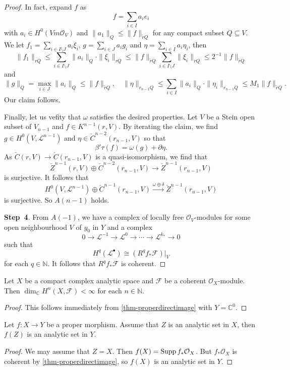 \begin{proof}
In fact, expand $f$ as 
\[
    f=\sum_{i\in I}a_i e_i  
\]
with $a_i\in H^0(Vm\mathcal{O}_V)$ and $\|a_1\|_Q\leq \|f\|_{\tilde{r}Q}$ for any compact subset $Q\subseteq V$. We let $f_1=\sum_{i\in I\setminus J}a_i \xi_i$, $g=\sum_{i\in J}a_i g_i$ and $\eta=\sum_{i\in I}a_i\eta_i$, then
\[
    \|f_1\|_{rQ}\leq \sum_{i\in I\setminus J}\|a_i\|_Q\cdot\|\xi_i\|_{rQ}\leq \|f\|_{\tilde{r}Q}\sum_{i\in I\setminus J}\|\xi_i\|_{rQ}\leq 2^{-1}\|f\|_{\tilde{r}Q}
\]
and
\[
\|g\|_Q=\max_{i\in J}\|a_i\|_Q\leq \|f\|_{\tilde{r}Q},\quad \|\eta\|_{r_{n-1}Q}\leq \sum_{i\in I}\|a_i\|_Q\cdot\|\eta_i\|_{r_{n-1}Q}\leq M_1\|f\|_{\tilde{r}Q}.    
\]
Our claim follows.

Finally, let us vefity that $\omega$ satisfies the desired properties. Let $V$ be a Stein open subset of $V_{n-1}$ and $f\in K^{n-1}(r,V)$. By iterating the claim, we find $g\in H^0(V,\mathcal{L}^{n-1})$ and $\eta\in \check{C}^{n-2}(r_{n-1},V)$ so that
\[
    \beta'\tau(f)=\omega(g)+\partial \eta.  
\]
As $\check{C}(r,V)\rightarrow \check{C}(r_{n-1},V)$ is a quasi-isomorphism, we find that 
\[
\check{Z}^{n-1}(r,V)\oplus \check{C}^{n-2}(r_{n-1},V)\rightarrow     \check{Z}^{n-1}(r_{n-1},V)
\]
is surjective. It follows that 
\[
H^0(V,\mathcal{L}^{n-1})\oplus \check{C}^{n-1}(r_{n-1},V)\xrightarrow{\omega\oplus \delta} \check{Z}^{n-1}(r_{n-1},V)
\]
is surjective. So $A(n-1)$ holds.

\textbf{Step~4}. From $A(-1)$, we have a complex of locally free $\mathcal{O}_V$-modules for some open neighbourhood $V$ of $y_0$ in $Y$ and a complex
\[
0\rightarrow \mathcal{L}^{-1}\rightarrow \mathcal{L}^0\rightarrow \cdots\rightarrow \mathcal{L}^{k_*}\rightarrow 0    
\]
such that
\[
    H^q(\mathcal{L}^{\bullet})\cong (R^qf_*\mathcal{F})|_V    
\]
for each $q\in \mathbb{N}$. It follows that $R^qf_*\mathcal{F}$ is coherent.
\end{proof}

\begin{corollary}
    Let $X$ be a compact complex analytic space and $\mathcal{F}$ be a coherent $\mathcal{O}_X$-module. Then $\dim_{\mathbb{C}}H^n(X,\mathcal{F})<\infty$ for each $n\in \mathbb{N}$.
\end{corollary}
\begin{proof}
    This follows immediately from \cref{thm-properdirectimage} with $Y=\mathbb{C}^0$.
\end{proof}

\begin{corollary}
    Let $f:X\rightarrow Y$ be a proper morphism. Assume that $Z$ is an analytic set in $X$, then $f(Z)$ is an analytic set in $Y$. 
\end{corollary}
\begin{proof}
    We may assume that $Z=X$. Then $f(X)=\operatorname{Supp} f_*\mathcal{O}_X$. But $f_*\mathcal{O}_X$ is coherent by \cref{thm-properdirectimage}, so $f(X)$ is an analytic set in $Y$.
\end{proof}

\printbibliography
